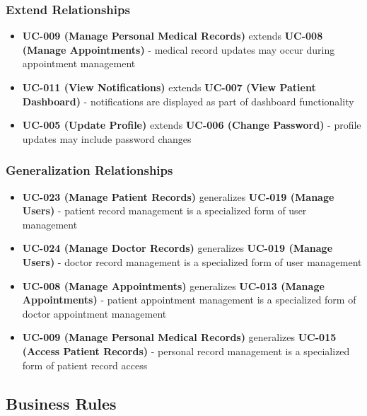 \documentclass[12pt,a4paper]{article}
\begin{document}
\subsubsection{Extend Relationships}
\begin{itemize}
    \item \textbf{UC-009 (Manage Personal Medical Records)} extends \textbf{UC-008 (Manage Appointments)} - medical record updates may occur during appointment management
    \item \textbf{UC-011 (View Notifications)} extends \textbf{UC-007 (View Patient Dashboard)} - notifications are displayed as part of dashboard functionality
    \item \textbf{UC-005 (Update Profile)} extends \textbf{UC-006 (Change Password)} - profile updates may include password changes
\end{itemize}

\subsubsection{Generalization Relationships}
\begin{itemize}
    \item \textbf{UC-023 (Manage Patient Records)} generalizes \textbf{UC-019 (Manage Users)} - patient record management is a specialized form of user management
    \item \textbf{UC-024 (Manage Doctor Records)} generalizes \textbf{UC-019 (Manage Users)} - doctor record management is a specialized form of user management
    \item \textbf{UC-008 (Manage Appointments)} generalizes \textbf{UC-013 (Manage Appointments)} - patient appointment management is a specialized form of doctor appointment management
    \item \textbf{UC-009 (Manage Personal Medical Records)} generalizes \textbf{UC-015 (Access Patient Records)} - personal record management is a specialized form of patient record access
\end{itemize}

\subsection{Business Rules}
\end{document}
